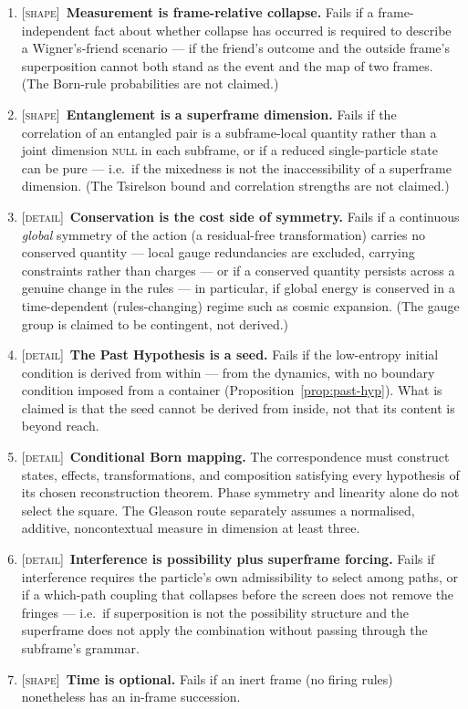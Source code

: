 \documentclass[11pt,a4paper]{article}
\theoremstyle{remark}\newtheorem{remark}[definition]{Remark}
\begin{document}
\begin{enumerate}[leftmargin=*]
requires antisymmetric state space; indistinguishability alone permits bosonic
as well as fermionic statistics.
\item \textsc{[shape]}~\textbf{Measurement is frame-relative collapse.} Fails if a
frame-independent fact about whether collapse has occurred is required to
describe a Wigner's-friend scenario --- if the friend's outcome and the outside
frame's superposition cannot both stand as the event and the map of two frames.
(The Born-rule probabilities are not claimed.)
\item \textsc{[shape]}~\textbf{Entanglement is a superframe dimension.} Fails if the correlation
of an entangled pair is a subframe-local quantity rather than a joint dimension
\textsc{null} in each subframe, or if a reduced single-particle state can be pure
--- i.e.\ if the mixedness is not the inaccessibility of a superframe dimension.
(The Tsirelson bound and correlation strengths are not claimed.)
\item \textsc{[detail]}~\textbf{Conservation is the cost side of symmetry.} Fails if a continuous
\emph{global} symmetry of the action (a residual-free transformation) carries no conserved
quantity --- local gauge redundancies are excluded, carrying constraints rather than charges --- or if a
conserved quantity persists across a genuine change in the rules --- in
particular, if global energy is conserved in a time-dependent (rules-changing)
regime such as cosmic expansion. (The gauge group is claimed to be contingent,
not derived.)
\item \textsc{[detail]}~\textbf{The Past Hypothesis is a seed.} Fails if the low-entropy initial
condition is derived from within --- from the dynamics, with no boundary condition imposed from a
container (Proposition~\ref{prop:past-hyp}). What is claimed is that the seed cannot be derived from
inside, not that its content is beyond reach.
\item \textsc{[detail]}~\textbf{Conditional Born mapping.} The correspondence must construct
states, effects, transformations, and composition satisfying every hypothesis
of its chosen reconstruction theorem. Phase symmetry and linearity alone do
not select the square. The Gleason route separately assumes a normalised,
additive, noncontextual measure in dimension at least three.
\item \textsc{[detail]}~\textbf{Interference is possibility plus superframe forcing.} Fails if
interference requires the particle's own admissibility to select among paths, or
if a which-path coupling that collapses before the screen does not remove the
fringes --- i.e.\ if superposition is not the possibility structure and the
superframe does not apply the combination without passing through the subframe's
grammar.
\item \textsc{[shape]}~\textbf{Time is optional.} Fails if
an inert frame (no firing rules) nonetheless has an in-frame succession.


\end{enumerate}
\end{document}
